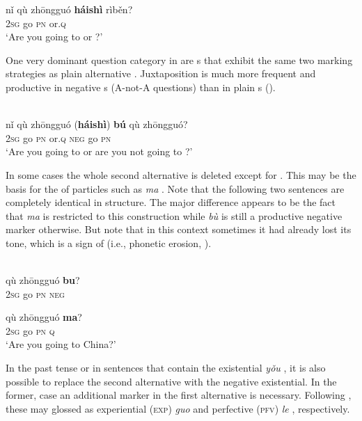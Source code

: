     \ex
    \gll nǐ  qù  zhōngguó \textbf{{háishì}} {rìběn?}\\
    2\textsc{sg}  go  \textsc{pn}    or.\textsc{q}    \\
    \glt ‘Are you going to  or ?’
    \z
    \z

One very dominant question category in   are s that exhibit the same two marking strategies as plain alternative . Juxtaposition is much more frequent and productive in negative s (A-not-A questions) than in plain s (\citealt[20]{Hölzl2016a}).

\ea%
    \label{ex:trans:11}
    \\
    \gll nǐ  qù  zhōngguó  (\textbf{{háishì}}) \textbf{{bú}} qù  zhōngguó?\\
    2\textsc{sg}  go  \textsc{pn}    or.\textsc{q}    \textsc{neg}    go  \textsc{pn}\\
    \glt ‘Are you going to  or are you not going to ?’
    \z

In some cases the whole second alternative is deleted except for . This may be the basis for the  of  particles such as \textit{ma} . Note that the following two sentences are completely identical in structure. The major difference appears to be the fact that \textit{ma} is restricted to this construction while \textit{bù}  is still a productive negative marker otherwise. But note that in this context sometimes it had already lost its tone, which is a sign of  (i.e., phonetic erosion, \citealt{Hölzl2015b}).

\ea%
    \label{ex:trans:12}
    \ea
    \\
     {qù} {zhōngguó} \textbf{{bu}}?\\
    2\textsc{sg}  go  \textsc{pn}    \textsc{neg}\\
    \glt
    
    \ex
     {qù} {zhōngguó} \textbf{{ma}}?\\
    2\textsc{sg}  go  \textsc{pn}    \textsc{q}\\
    \glt ‘Are you going to China?’
    \z
    \z

In the past tense or in sentences that contain the existential \textit{yǒu} , it is also possible to replace the second alternative with the negative existential. In the former, case an additional marker in the first alternative is necessary. Following \cite[64–70]{SunChaofen2006}, these may glossed as experiential (\textsc{exp}) \textit{guo}  and perfective (\textsc{pfv}) \textit{le} , respectively.

